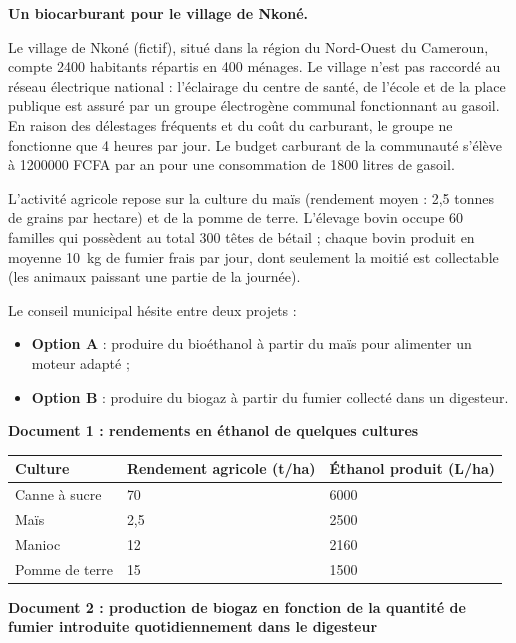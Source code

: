 \documentclass[11pt]{article}
\newcounter{popsec}
\newcounter{popsub}
\newcommand{\courssub}[1]{%
  \stepcounter{popsub}%
  \par\vspace{9pt}\noindent{\popxbold\fontsize{11.5}{13}\selectfont\color{popink}{\color{poporange}\thepopsec.\thepopsub}\hspace{6pt}#1}\par\nopagebreak\vspace{4pt}
}
\begin{document}
\courssub{Situation}
\textbf{Un biocarburant pour le village de Nkoné.}

Le village de Nkoné (fictif), situé dans la région du Nord-Ouest du Cameroun, compte \num{2400} habitants répartis en 400 ménages. Le village n'est pas raccordé au réseau électrique national : l'éclairage du centre de santé, de l'école et de la place publique est assuré par un groupe électrogène communal fonctionnant au gasoil. En raison des délestages fréquents et du coût du carburant, le groupe ne fonctionne que 4 heures par jour. Le budget carburant de la communauté s'élève à \num{1200000} FCFA par an pour une consommation de \num{1800} litres de gasoil.

L'activité agricole repose sur la culture du maïs (rendement moyen : 2,5 tonnes de grains par hectare) et de la pomme de terre. L'élevage bovin occupe 60 familles qui possèdent au total 300 têtes de bétail ; chaque bovin produit en moyenne \SI{10}{kg} de fumier frais par jour, dont seulement la moitié est collectable (les animaux paissant une partie de la journée).

Le conseil municipal hésite entre deux projets :
\begin{itemize}
\item \textbf{Option A} : produire du bioéthanol à partir du maïs pour alimenter un moteur adapté ;
\item \textbf{Option B} : produire du biogaz à partir du fumier collecté dans un digesteur.
\end{itemize}

\textbf{Document 1 : rendements en éthanol de quelques cultures}

\begin{center}
\begin{tabularx}{\linewidth}{|l|X|X|}\hline
\rowcolor{popblueL} \textbf{Culture} & \textbf{Rendement agricole (t/ha)} & \textbf{Éthanol produit (L/ha)} \\ \hline
Canne à sucre & 70 & \num{6000} \\ \hline
Maïs & 2,5 & \num{2500} \\ \hline
Manioc & 12 & \num{2160} \\ \hline
Pomme de terre & 15 & \num{1500} \\ \hline
\end{tabularx}
\end{center}

\textbf{Document 2 : production de biogaz en fonction de la quantité de fumier introduite quotidiennement dans le digesteur}
\end{document}
